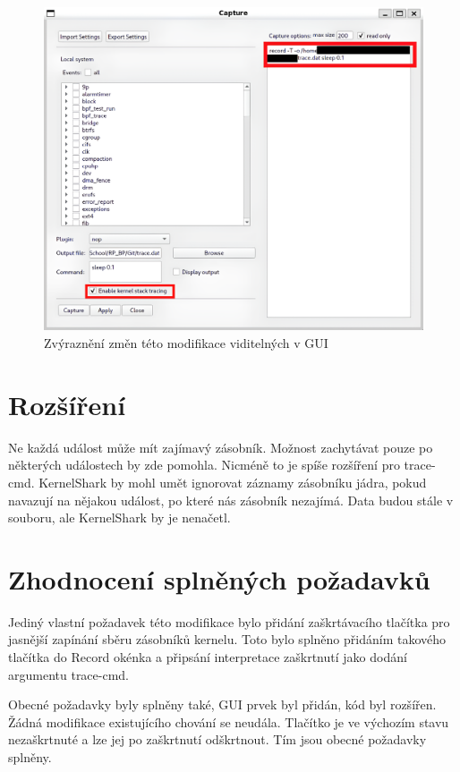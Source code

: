 \begin{figure}[p]\centering
    \includegraphics[width=140mm]{img/modif-record-kstack}
    \caption{Zvýraznění změn této modifikace viditelných v GUI}
    \label{obr01:record-kstack}
\end{figure}

\section{Rozšíření}

Ne každá událost může mít zajímavý zásobník. Možnost zachytávat pouze po některých událostech by zde pomohla. Nicméně to je spíše rozšíření pro trace-cmd. KernelShark by mohl umět ignorovat záznamy zásobníku jádra, pokud navazují na nějakou událost, po které nás zásobník nezajímá. Data budou stále v souboru, ale KernelShark by je nenačetl.

\section{Zhodnocení splněných požadavků}
Jediný vlastní požadavek této modifikace bylo přidání zaškrtávacího tlačítka pro jasnější zapínání sběru zásobníků kernelu. Toto bylo splněno přidáním takového tlačítka do Record okénka a připsání interpretace zaškrtnutí jako dodání argumentu trace-cmd.

Obecné požadavky byly splněny také, GUI prvek byl přidán, kód byl rozšířen. Žádná modifikace existujícího chování se neudála. Tlačítko je ve výchozím stavu nezaškrtnuté a lze jej po zaškrtnutí odškrtnout. Tím jsou obecné požadavky splněny.
